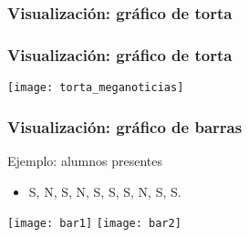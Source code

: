 \documentclass[table]{beamer}
\begin{document}
\iffalse
\begin{frame}
    \frametitle{Transformaciones}
    \begin{block}{Cambio de unidades}
        \begin{itemize}
            \item Transformación debe ser ``invertible''.
        \end{itemize}
    \end{block}
    \begin{center}
        \texttt{[image: agrupados]}
    \end{center}
\end{frame}
\fi

\begin{frame}
    \frametitle{Visualización: gráfico de torta}
    \begin{center}
    \end{center}
\end{frame}

\begin{frame}
    \frametitle{Visualización: gráfico de torta}
    \begin{center}
        \texttt{[image: torta\_meganoticias]}
    \end{center}
\end{frame}

\begin{frame}
    \frametitle{Visualización: gráfico de barras}
    \begin{exampleblock}{Ejemplo: alumnos presentes}
        \begin{itemize}
            \item S, N, S, N, S, S, S, N, S, S.
        \end{itemize}
    \end{exampleblock}
    \begin{center}
        \texttt{[image: bar1]}
        \texttt{[image: bar2]}
    \end{center}
\end{frame}
\end{document}
